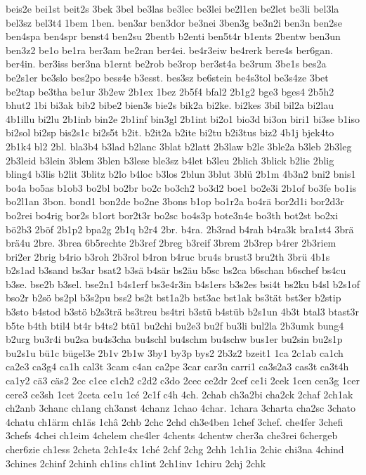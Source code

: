 {beis2e
bei1st
beit2s
3bek
3bel
be3las
be3lec
be3lei
be2l1en
be2let
be3li
bel3la
bel3sz
bel3t4
1bem
1ben.
ben3ar
ben3dor
be3nei
3ben3g
be3n2i
ben3n
ben2se
ben4spa
ben4spr
benst4
ben2su
2bentb
b2enti
ben5t4r
b1ents
2bentw
ben3un
ben3z2
be1o
be1ra
ber3am
be2ran
ber4ei.
be4r3eiw
be4rerk
bere4s
ber6gan.
ber4in.
ber3iss
ber3na
b1ernt
be2rob
be3rop
ber3st4a
be3rum
3be1s
bes2a
be2s1er
be3slo
bes2po
bess4e
b3esst.
bes3sz
be6stein
be4s3tol
be3s4ze
3bet
be2tap
be3tha
be1ur
3b2ew
2b1ex
1bez
2b5f4
bfal2
2b1g2
bge3
bges4
2b5h2
bhut2
1bi
bi3ak
bib2
bibe2
bien3s
bie2s
bik2a
bi2ke.
bi2kes
3bil
bil2a
bi2lau
4b1illu
bi2lu
2b1inb
bin2e
2b1inf
bin3gl
2b1int
bi2o1
bio3d
bi3on
biri1
bi3se
b1iso
bi2sol
bi2sp
bis2s1c
bi2s5t
b2it.
b2it2a
b2ite
bi2tu
b2i3tus
biz2
4b1j
bjek4to
2b1k4
bl2
2bl.
bla3b4
b3lad
b2lanc
3blat
b2latt
2b3law
b2le
3ble2a
b3leb
2b3leg
2b3leid
b3lein
3blem
3blen
b3lese
ble3sz
b4let
b3leu
2blich
3blick
b2lie
2blig
bling4
b3lis
b2lit
3blitz
b2lo
b4loc
b3los
2blun
3blut
3blü
2b1m
4b3n2
bni2
bnis1
bo4a
bo5as
b1ob3
bo2bl
bo2br
bo2c
bo3ch2
bo3d2
boe1
bo2e3i
2b1of
bo3fe
bo1is
bo2l1an
3bon.
bond1
bon2de
bo2ne
3bons
b1op
bo1r2a
bo4rä
bor2d1i
bor2d3r
bo2rei
bo4rig
bor2s
b1ort
bor2t3r
bo2sc
bo4s3p
bote3n4e
bo3th
bot2st
bo2xi
bö2b3
2böf
2b1p2
bpa2g
2b1q
b2r4
2br.
b4ra.
2b3rad
b4rah
b4ra3k
bra1st4
3brä
brä4u
2bre.
3brea
6b5rechte
2b3ref
2breg
b3reif
3brem
2b3rep
b4rer
2b3riem
bri2er
2brig
b4rio
b3roh
2b3rol
b4ron
b4ruc
bru4s
brust3
bru2th
3brü
4b1s
b2s1ad
b3sand
bs3ar
bsat2
b3sä
b4sär
bs2äu
b5sc
bs2ca
b6schan
b6schef
bs4cu
b3se.
bse2b
b3sel.
bse2n1
b4s1erf
bs3e4r3in
b4s1ers
b3s2es
bsi4t
bs2ku
b4sl
b2s1of
bso2r
b2sö
bs2pl
b3s2pu
bss2
bs2t
bst1a2b
bst3ac
bst1ak
bs3tät
bst3er
b2stip
b3sto
b4stod
b3stö
b2s3trä
bs3treu
bs4tri
b3stü
b4stüb
b2s1un
4b3t
btal3
btast3r
b5te
b4th
btil4
bt4r
b4ts2
btü1
bu2chi
bu2e3
bu2f
bu3li
bul2la
2b3umk
bung4
b2urg
bu3r4i
bu2sa
bu4s3cha
bu4schl
bu4schm
bu4schw
bus1er
bu2sin
bu2s1p
bu2s1u
bü1c
bügel3e
2b1v
2b1w
3by1
by3p
bys2
2b3z2
bzeit1
1ca
2c1ab
ca1ch
ca2e3
ca3g4
ca1h
cal3t
3cam
c4an
ca2pe
3car
car3n
carri1
ca3s2a3
cas3t
ca3t4h
ca1y2
cä3
cäs2
2cc
c1ce
c1ch2
c2d2
c3do
2cec
ce2dr
2cef
ce1i
2cek
1cen
cen3g
1cer
cere3
ce3sh
1cet
2ceta
ce1u
1cé
2c1f
c4h
4ch.
2chab
ch3a2bi
cha2ck
2chaf
2ch1ak
ch2anb
3chanc
ch1ang
ch3anst
4chanz
1chao
4char.
1chara
3charta
cha2sc
3chato
4chatu
ch1ärm
ch1äs
1châ
2chb
2chc
2chd
ch3e4ben
1chef
3chef.
che4fer
3chefi
3chefs
4chei
ch1eim
4chelem
che4ler
4chents
4chentw
cher3a
che3rei
6chergeb
cher6zie
ch1ess
2cheta
2ch1e4x
1ché
2chf
2chg
2chh
1ch1ia
2chic
chi3na
4chind
3chines
2chinf
2chinh
ch1ins
ch1int
2ch1inv
1chiru
2chj
2chk
}
